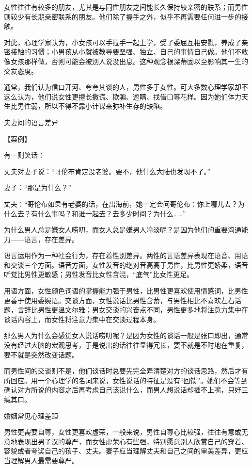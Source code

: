 \documentclass[12pt,UTF8]{ctexbook}
\begin{document}
女性往往有较多的朋友，尤其是与同性朋友之间能长久保持较亲密的联系；而男性则较少有长期亲密联系的朋友。他们除了握手之外，似乎不再需要任何进一步的接触。

对此，心理学家认为，小女孩可以手拉手一起上学，受了委屈互相安慰，养成了亲密接触的习惯；小男孩从小就被教导要坚强、独立、自己的事情自己做。他们不敢像女孩那样做，否则可能会被别人说没出息。这种观念根深蒂固以至影响其一生的交友态度。

通常，我们认为信口开河、夸夸其谈的人，男性多于女性。可大多数心理学家却不这么认为，他们说女性更擅长撒谎、欺骗、遮瞒、找借口等花样。因为她们体力天生比男性弱，所以不得不靠小计谋来弥补生存的缺陷。





夫妻间的语言差异


【案例】

有一则笑话：

丈夫对妻子说：“哥伦布肯定没老婆。要不，他什么大陆也发现不了。”

妻子：“那是为什么？”

丈夫：“哥伦布如果有老婆的话，在出海前，她一定会问哥伦布：你上哪儿去？为什么去？有什么事吗？和谁一起去？去多少时间？为什么……”

为什么男人总是嫌女人唠叨，而女人总是嫌男人冷淡呢？是因为他们的重要沟通能力——语言，存在差异。

语言运用作为一种社会行为，存在着性别差异。两性的言语差异表现在语音、用语和交谈三个方面。语音方面，女性发音的绝对音高高于男性，比男性更娇柔，语音听觉比男性更敏感；男性发音比女性含混，“底气”比女性更足。

用语方面，女性颜色词语的掌握能力强于男性，比男性更喜欢使用情感词，比男性更善于使用委婉语。交谈方面，女性说话比男性含蓄，与男性相比不喜欢左右话题，言辞比男性更温文尔雅；男女交谈的兴奋点不同，男性更多地将注意力集中在谈话内容上，而女性将注意力集中在交谈过程本身。

那么男人为什么会感觉女人说话唠叨呢？是因为女性的谈话一般是张口即出，通常没有经过大脑的宏观思考，于是说出的话往往显得冗长，要不就是不时地在重复，要不就是突然改变话题。

而男性间的交谈则不是，他们谈话时总要先完全弄清楚对方的谈话思路，然后才有所回应。用一个心理学的名词来说，女性说话的特征是没有“回馈”。她们不会等到确认对方所说的内容之后再考虑自己该说什么，而男人想说话却插不上嘴，只好三缄其口。





婚姻常见心理差距


男性更需要自尊，女性更喜欢虚荣，一般来说，男性自尊心比较强，往往有意或无意地表现出男子汉的尊严，而女性虚荣心有些强，特别愿意别人欣赏自己的穿着、容貌或者夸奖自己的孩子、丈夫。妻子应当理解丈夫和自己之间的审美差异，更应当理解男人最需要尊严。
\end{document}
